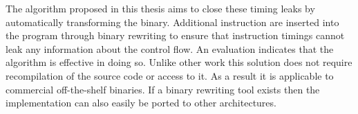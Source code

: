 The algorithm proposed in this thesis aims to close these timing leaks by automatically transforming the binary. 
Additional instruction are inserted into the program through binary rewriting to ensure that instruction 
timings cannot leak any information about the control flow. An evaluation indicates that the algorithm is effective in doing so.
Unlike other work this solution does not require recompilation of the 
source code or access to it. 
As a result it is applicable to commercial off-the-shelf binaries.   
If a binary rewriting tool exists then the implementation can also easily be ported to other architectures. 